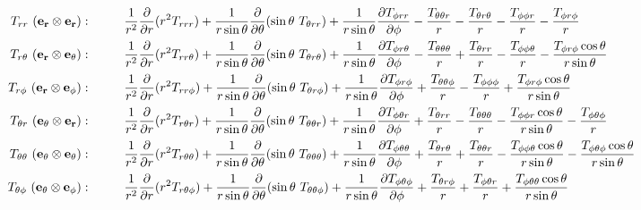 \documentclass[11pt]{article}
\newcommand{\dr}{\frac{\partial}{\partial r}}
\begin{document}
\begin{landscape}
\begin{align}
T_{rr} \ ({\bf{e_r \otimes e_r}}): & \hspace{1cm} \frac{1}{r^2}\dr (r^2 T_{rrr}) + \frac{1}{r\sin{\theta}}\frac{\partial}{\partial \theta} (\sin{\theta} \ T_{\theta rr}) + \frac{1}{r\sin{\theta}}\frac{\partial T_{\phi rr}}{\partial \phi} - \frac{T_{\theta\theta r}}{r} - \frac{T_{\theta r \theta}}{r} -\frac{T_{\phi\phi r}}{r} - \frac{T_{\phi r \phi}}{r} \\
T_{r\theta} \ ({\bf{e_r \otimes e_\theta}}): & \hspace{1cm} \frac{1}{r^2}\dr (r^2 T_{rr \theta}) + \frac{1}{r\sin{\theta}}\frac{\partial}{\partial \theta} (\sin{\theta} \ T_{\theta r \theta}) + \frac{1}{r\sin{\theta}}\frac{\partial T_{\phi r \theta}}{\partial \phi} - \frac{T_{\theta \theta \theta}}{r} + \frac{T_{\theta rr}}{r} - \frac{T_{\phi \phi \theta}}{r} - \frac{T_{\phi r \phi} \cos{\theta}}{r\sin{\theta}} \\
T_{r \phi} \ ({\bf{e_r \otimes e_\phi}}): & \hspace{1cm} \frac{1}{r^2}\dr (r^2 T_{rr \phi}) + \frac{1}{r\sin{\theta}}\frac{\partial}{\partial \theta} (\sin{\theta} \ T_{\theta r \phi}) + \frac{1}{r\sin{\theta}}\frac{\partial T_{\phi r \phi}}{\partial \phi} + \frac{T_{\theta \theta \phi}}{r} - \frac{T_{\phi \phi \phi}}{r} + \frac{T_{\phi r \phi} \cos{\theta}}{r\sin{\theta}} \\
T_{\theta r} \ ({\bf{e_\theta \otimes e_r}}): & \hspace{1cm} \frac{1}{r^2}\dr (r^2 T_{r \theta r}) + \frac{1}{r\sin{\theta}}\frac{\partial}{\partial \theta} (\sin{\theta} \ T_{\theta \theta r}) + \frac{1}{r\sin{\theta}}\frac{\partial T_{\phi \theta r}}{\partial \phi} + \frac{T_{\theta rr}}{r} - \frac{T_{\theta \theta \theta}}{r} - \frac{T_{\phi \phi r} \cos{\theta}}{r \sin{\theta}} - \frac{T_{\phi \theta \phi}}{r}  \\
T_{\theta \theta} \ ({\bf{e_\theta \otimes e_\theta}}): & \hspace{1cm} \frac{1}{r^2}\dr (r^2 T_{r \theta \theta}) + \frac{1}{r\sin{\theta}}\frac{\partial}{\partial \theta} (\sin{\theta} \ T_{\theta \theta \theta}) + \frac{1}{r\sin{\theta}}\frac{\partial T_{\phi \theta \theta}}{\partial \phi} + \frac{T_{\theta r \theta}}{r} + \frac{T_{\theta \theta r}}{r} - \frac{T_{\phi \phi \theta} \cos{\theta}}{r\sin{\theta}} - \frac{T_{\phi \theta \phi} \cos{\theta}}{r\sin{\theta}} \\
T_{\theta \phi} \ ({\bf{e_\theta \otimes e_\phi}}): & \hspace{1cm} \frac{1}{r^2}\dr (r^2 T_{r \theta \phi}) + \frac{1}{r\sin{\theta}}\frac{\partial}{\partial \theta} (\sin{\theta} \ T_{\theta \theta \phi}) + \frac{1}{r\sin{\theta}}\frac{\partial T_{\phi \theta \phi}}{\partial \phi} + \frac{T_{\theta r \phi}}{r} + \frac{T_{\phi \theta r}}{r} + \frac{T_{\phi \theta \theta} \cos{\theta}}{r\sin{\theta}} \\

\end{align}
\end{landscape}
\end{document}
